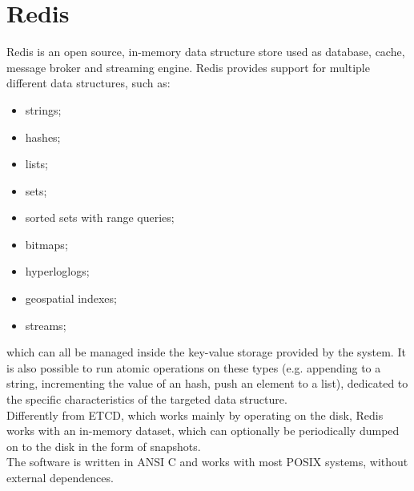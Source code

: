 \section{Redis}
Redis is an open source, in-memory data structure store used as database, cache, message broker and streaming engine. Redis provides support for multiple different data structures, such as:
\begin{itemize}
	\item strings;
	\item hashes;
	\item lists;
	\item sets;
	\item sorted sets with range queries;
	\item bitmaps;
	\item hyperloglogs;
	\item geospatial indexes;
	\item streams;
\end{itemize}
which can all be managed inside the key-value storage provided by the system. It is also possible to run atomic operations on these types (e.g. appending to a string, incrementing the value of an hash, push an element to a list), dedicated to the specific characteristics of the targeted data structure. \\
Differently from ETCD, which works mainly by operating on the disk, Redis works with an in-memory dataset, which can optionally be periodically dumped on to the disk in the form of snapshots. \\
The software is written in ANSI C and works with most POSIX systems, without external dependences.

